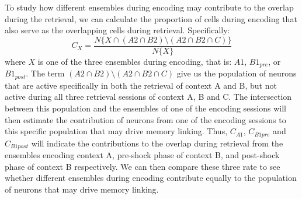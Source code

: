 \documentclass[master.tex]{subfiles}
\begin{document}
To study how different ensembles during encoding may contribute to the overlap
during the retrieval, we can calculate the proportion of cells during encoding
that also serve as the overlapping cells during retrieval. Specifically:
\begin{displaymath}
  C_{X} = \frac{N\{X \cap (A2 \cap B2) \setminus (A2 \cap B2 \cap C)\}}{N\{X\}}
\end{displaymath}
where $X$ is one of the three ensembles during encoding, that is: $A1$,
$B1_{pre}$, or $B1_{post}$. The term $(A2 \cap B2) \setminus (A2 \cap B2 \cap
C)$ give us the population of neurons that are active specifically in both the
retrieval of context A and B, but not active during all three retrieval sessions
of context A, B and C. The intersection between this population and the
ensembles of one of the encoding sessions will then estimate the contribution of
neurons from one of the encoding sessions to this specific population that may
drive memory linking. Thus, $C_{A1}$, $C_{B1pre}$ and $C_{B1post}$ will indicate
the contributions to the overlap during retrieval from the ensembles encoding
context A, pre-shock phase of context B, and post-shock phase of context B
respectively. We can then compare these three rate to see whether different
ensembles during encoding contribute equally to the population of neurons that
may drive memory linking.
\end{document}
